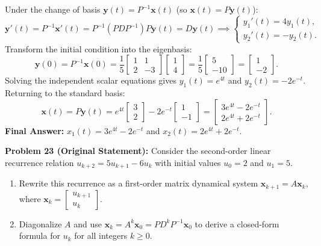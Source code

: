 \documentclass[11pt, letterpaper]{article}
\theoremstyle{definition}
\theoremstyle{remark}
\begin{document}
Under the change of basis $\mathbf{y}(t) = P^{-1}\mathbf{x}(t)$ (so $\mathbf{x}(t) = P\mathbf{y}(t)$):
\[
\mathbf{y}'(t) = P^{-1}\mathbf{x}'(t) = P^{-1}(PDP^{-1})P\mathbf{y}(t) = D\mathbf{y}(t) \implies \begin{cases} y_{1}'(t) = 4y_{1}(t), \\ y_{2}'(t) = -y_{2}(t). \end{cases}
\]
Transform the initial condition into the eigenbasis:
\[
\mathbf{y}(0) = P^{-1}\mathbf{x}(0) = \frac{1}{5}\begin{bmatrix} 1 & 1 \\ 2 & -3 \end{bmatrix}\begin{bmatrix} 1 \\ 4 \end{bmatrix} = \frac{1}{5}\begin{bmatrix} 5 \\ -10 \end{bmatrix} = \begin{bmatrix} 1 \\ -2 \end{bmatrix}.
\]
Solving the independent scalar equations gives $y_{1}(t) = e^{4t}$ and $y_{2}(t) = -2e^{-t}$. Returning to the standard basis:
\[
\mathbf{x}(t) = P\mathbf{y}(t) = e^{4t}\begin{bmatrix} 3 \\ 2 \end{bmatrix} - 2e^{-t}\begin{bmatrix} 1 \\ -1 \end{bmatrix} = \begin{bmatrix} 3e^{4t} - 2e^{-t} \\ 2e^{4t} + 2e^{-t} \end{bmatrix}.
\]
\textbf{Final Answer:} $x_{1}(t) = 3e^{4t} - 2e^{-t}$ and $x_{2}(t) = 2e^{4t} + 2e^{-t}$.

\vspace{0.8em}
\textbf{Problem 23 (Original Statement):}
Consider the second-order linear recurrence relation $u_{k+2} = 5u_{k+1} - 6u_{k}$ with initial values $u_{0} = 2$ and $u_{1} = 5$.
\begin{enumerate}[label=(\alph*)]
    \item Rewrite this recurrence as a first-order matrix dynamical system $\mathbf{x}_{k+1} = A\mathbf{x}_{k}$, where $\mathbf{x}_{k} = \begin{bmatrix} u_{k+1} \\ u_{k} \end{bmatrix}$.
    \item Diagonalize $A$ and use $\mathbf{x}_{k} = A^{k}\mathbf{x}_{0} = PD^{k}P^{-1}\mathbf{x}_{0}$ to derive a closed-form formula for $u_{k}$ for all integers $k \ge 0$.
\end{enumerate}
\end{document}
